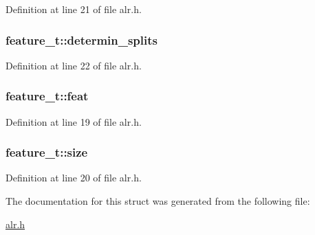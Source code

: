 Definition at line 21 of file alr.\-h.

\hypertarget{structfeature__t_aff04af2168f1be430f16d6af4ddfa63b}{
\subsubsection[{determin\-\_\-splits}]{ feature\-\_\-t\-::determin\-\_\-splits}}\label{structfeature__t_aff04af2168f1be430f16d6af4ddfa63b}


Definition at line 22 of file alr.\-h.

\hypertarget{structfeature__t_ad6b70165369321932d2ea796e196fee9}{
\subsubsection[{feat}]{ feature\-\_\-t\-::feat}}\label{structfeature__t_ad6b70165369321932d2ea796e196fee9}


Definition at line 19 of file alr.\-h.

\hypertarget{structfeature__t_a8bcf9f7c29278bfa6ffe132c07cbce18}{
\subsubsection[{size}]{ feature\-\_\-t\-::size}}\label{structfeature__t_a8bcf9f7c29278bfa6ffe132c07cbce18}


Definition at line 20 of file alr.\-h.



The documentation for this struct was generated from the following file\-:\begin{DoxyCompactItemize}
\item 
\hyperlink{alr_8h}{alr.\-h}\end{DoxyCompactItemize}
